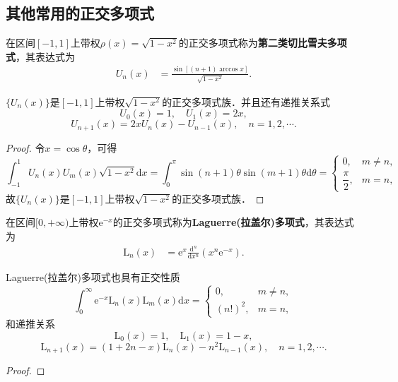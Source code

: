 \documentclass[../../main.tex]{subfiles}
\begin{document}
\subsection{其他常用的正交多项式}

\begin{definition}[第二类切比雪夫多项式]\label{definition:第二类切比雪夫多项式}
在区间$[-1,1]$上带权$\rho(x) = \sqrt{1 - x^2}$的正交多项式称为\textbf{第二类切比雪夫多项式}，其表达式为
\begin{align}\label{eq:数值分析-3-2.16}
U_n(x) &= \frac{\sin[(n + 1)\arccos x]}{\sqrt{1 - x^2}}.
\end{align}
\end{definition}

\begin{theorem}
$\{U_n(x)\}$是$[-1,1]$上带权$\sqrt{1 - x^2}$的正交多项式族．并且还有递推关系式
$$U_0(x) = 1,\quad U_1(x) = 2x,$$
$$U_{n+1}(x) = 2xU_n(x) - U_{n-1}(x),\quad n = 1,2,\cdots.$$
\end{theorem}
\begin{proof}
令$x = \cos\theta$，可得
$$\int_{-1}^1 U_n(x)U_m(x)\sqrt{1 - x^2}\mathrm{d}x = \int_0^\pi \sin(n + 1)\theta\sin(m + 1)\theta\mathrm{d}\theta =
\begin{cases}
0, & m \neq n, \\
\dfrac{\pi}{2}, & m = n,
\end{cases}$$
故$\{U_n(x)\}$是$[-1,1]$上带权$\sqrt{1 - x^2}$的正交多项式族．

\end{proof}

\begin{definition}
在区间$[0,+\infty)$上带权$\mathrm{e}^{-x}$的正交多项式称为\textbf{Laguerre(拉盖尔)多项式}，其表达式为
\begin{align}\label{eq:数值分析-3-2.17}
\mathrm{L}_n(x) &= \mathrm{e}^x \frac{\mathrm{d}^n}{\mathrm{d}x^n}(x^n \mathrm{e}^{-x}).
\end{align}
\end{definition}

\begin{theorem}
Laguerre(拉盖尔)多项式也具有正交性质
$$\int_0^\infty \mathrm{e}^{-x}\mathrm{L}_n(x)\mathrm{L}_m(x)\mathrm{d}x =
\begin{cases}
0, & m \neq n, \\
(n!)^2, & m = n,
\end{cases}$$
和递推关系
$$\mathrm{L}_0(x) = 1,\quad \mathrm{L}_1(x) = 1 - x,$$
$$\mathrm{L}_{n+1}(x) = (1 + 2n - x)\mathrm{L}_n(x) - n^2\mathrm{L}_{n-1}(x),\quad n = 1,2,\cdots.$$
\end{theorem}
\begin{proof}


\end{proof}
\end{document}
